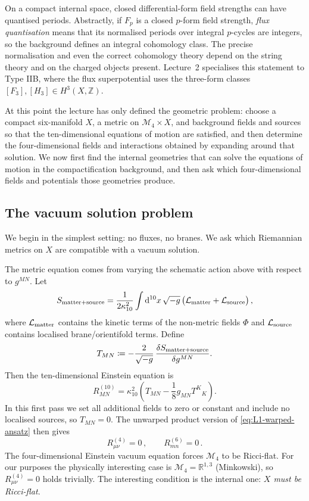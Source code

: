 On a compact internal space, closed differential-form field
strengths can have quantised periods. Abstractly, if $F_p$ is a
closed $p$-form field strength, \emph{flux quantisation} means that its
normalised periods over integral $p$-cycles are integers, so the
background defines an integral cohomology class. The precise
normalisation and even the correct cohomology theory depend on the
string theory and on the charged objects present. Lecture~2
specialises this statement to Type IIB, where the flux
superpotential uses the three-form classes
$[F_3],[H_3]\in H^3(X,\mathbb{Z})$.

At this point the lecture has only defined the geometric problem: choose a compact six-manifold $X$, a metric on $\mathcal{M}_4\times X$, and background fields and sources
so that the ten-dimensional equations of motion are satisfied, and
then determine the four-dimensional fields and interactions obtained
by expanding around that solution.
We now first find the internal geometries that can solve the equations of motion in the compactification background, and then ask which four-dimensional fields and
potentials those geometries produce.

\subsection{The vacuum solution problem}\label{ssec:L1-vacuum}

We begin in the simplest setting: no fluxes, no branes. We ask which
Riemannian metrics on $X$ are compatible with a vacuum solution.

The metric equation comes from varying the schematic action above
with respect to $g^{MN}$. Let
\begin{equation}
    S_{\rm matter+source}
    =
    \frac{1}{2\kappa_{10}^2}
    \int \mathrm{d}^{10}x\,\sqrt{-g}\,
    \bigl(\mathcal{L}_{\rm matter}+\mathcal{L}_{\rm source}\bigr)\, ,
\end{equation}
where $\mathcal{L}_{\rm matter}$ contains the kinetic terms of the
non-metric fields $\Phi$ and $\mathcal{L}_{\rm source}$ contains
localised brane/orientifold terms. Define
\begin{equation}
    T_{MN}
    \coloneqq  
    -\frac{2}{\sqrt{-g}}\,
    \frac{\delta S_{\rm matter+source}}{\delta g^{MN}} .
\end{equation}
Then the ten-dimensional Einstein equation is
\begin{equation}\label{eq:EOMRvac} 
    R^{(10)}_{MN}
    =
    \kappa_{10}^2
    \left(T_{MN}-\frac18 g_{MN}T^K{}_K\right).
\end{equation}
In this first pass we set all additional fields to zero or constant
and include no localised sources, so $T_{MN}=0$. The unwarped product
version of \eqref{eq:L1-warped-ansatz} then gives
\begin{equation}
    R_{\mu\nu}^{(4)} = 0 \,, \qquad R_{mn}^{(6)} = 0 \,.
\end{equation}
The four-dimensional Einstein vacuum equation forces $\mathcal{M}_4$
to be Ricci-flat. For our purposes the physically interesting case
is $\mathcal{M}_4 = \mathbb{R}^{1,3}$ (Minkowski), so
$R_{\mu\nu}^{(4)}=0$ holds trivially. The interesting condition is
the internal one: \emph{$X$ must be Ricci-flat}.

